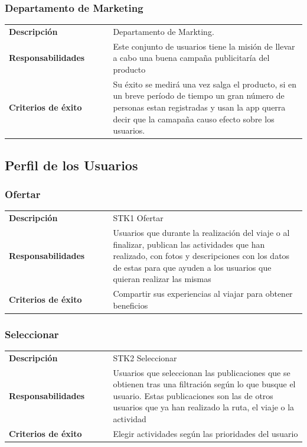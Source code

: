 \documentclass[11pt]{article}
\begin{document}
\subsubsection{Departamento de Marketing}
\begin{table}[H]
  \centering
  \begin{tabular}{p{0.35\linewidth}|p{0.65\linewidth}}
    \toprule
    \textbf{Descripción} & Departamento de Markting.\\ 
    \textbf{Responsabilidades} & Este conjunto de usuarios tiene la misión de llevar a cabo una buena campaña publicitaría del producto \\
    \textbf{Criterios de éxito} & Su éxito se medirá una vez salga el producto, si en un breve período de tiempo un gran número de personas estan registradas y usan la app querra decir que la camapaña causo efecto sobre los usuarios. \\
    \bottomrule
  \end{tabular}
\end{table}


\subsection{Perfil de los Usuarios}
\subsubsection{Ofertar}
\begin{table}[H]
  \centering
  \begin{tabular}{p{0.35\linewidth}|p{0.65\linewidth}}
    \toprule
    \textbf{Descripción} & STK1 Ofertar\\
    \textbf{Responsabilidades} & Usuarios que durante la realización del viaje o al finalizar, publican las actividades que han realizado, con fotos y descripciones con los datos de estas para que ayuden a los usuarios que quieran realizar las mismas\\
    \textbf{Criterios de éxito} &  Compartir sus experiencias al viajar para obtener beneficios\\
    \bottomrule
  \end{tabular}
\end{table}

\subsubsection{Seleccionar}
\begin{table}[H]
  \centering
  \begin{tabular}{p{0.35\linewidth}|p{0.65\linewidth}}
    \toprule
    \textbf{Descripción} & STK2 Seleccionar\\
    \textbf{Responsabilidades} & Usuarios que seleccionan las publicaciones que se obtienen tras una filtración según lo que busque el usuario. Estas publicaciones son las de otros usuarios que ya han realizado la ruta, el viaje o la actividad\\
    \textbf{Criterios de éxito} &  Elegir actividades según las prioridades del usuario\\
    \bottomrule
  \end{tabular}
\end{table}
\end{document}

